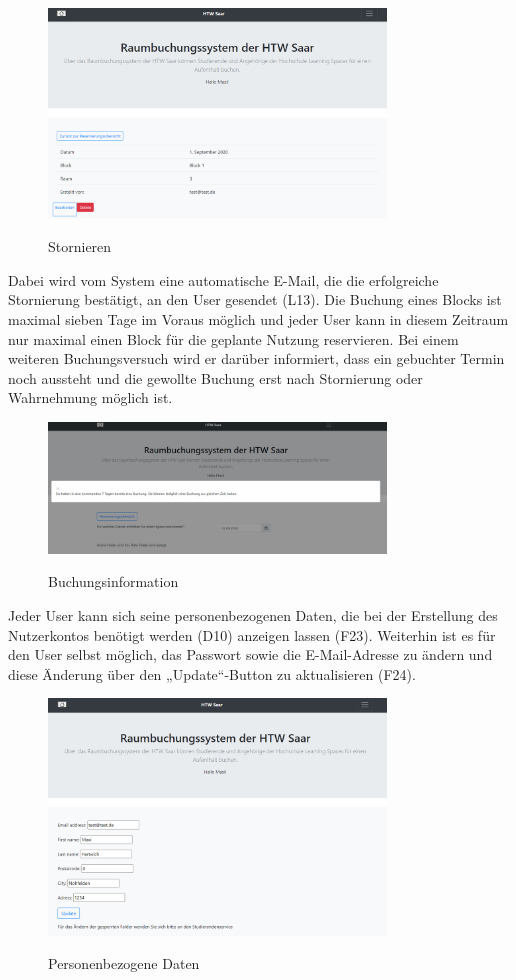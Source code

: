 \documentclass[a4paper,report,headsepline]{scrreprt}
\begin{document}
\clearpage
\begin{figure}[h]
    \centering
    \caption{Stornieren}
    \includegraphics[width=0.8\textwidth]{Stornieren}
    \label{fig:Stornieren}
\end{figure}
Dabei wird vom System eine automatische E-Mail, die die erfolgreiche Stornierung bestätigt, an den User gesendet (L13).
Die Buchung eines Blocks ist maximal sieben Tage im Voraus möglich und jeder User kann in diesem Zeitraum nur maximal einen Block für die geplante Nutzung reservieren. Bei einem weiteren Buchungsversuch wird er darüber informiert, dass ein gebuchter Termin noch aussteht und die gewollte Buchung erst nach Stornierung oder Wahrnehmung möglich ist.
\begin{figure}[h]
    \centering
    \caption{Buchungsinformation}
    \includegraphics[width=0.8\textwidth]{Buchungsinformation}
    \label{fig:Buchungsinformation}
\end{figure}
\clearpage
Jeder User kann sich seine personenbezogenen Daten, die bei der Erstellung des Nutzerkontos benötigt werden (D10) anzeigen lassen (F23). Weiterhin ist es für den User selbst möglich, das Passwort sowie die E-Mail-Adresse zu ändern und diese Änderung über den „Update“-Button zu aktualisieren (F24).
\begin{figure}[h]
    \centering
    \caption{Personenbezogene Daten}
    \includegraphics[width=0.8\textwidth]{Personenbezogene Daten}
    \label{fig:Personenbezogene Daten}
\end{figure}
\end{document}
